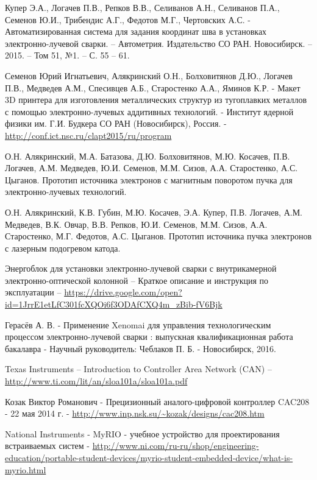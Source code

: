 \documentclass[14pt,russian,a4paper]{extarticle}
\begin{document}
\begin{thebibliography}{99}

Купер Э.А., Логачев П.В., Репков В.В., Селиванов А.Н., Селиванов П.А., Семенов Ю.И., Трибендис А.Г., Федотов М.Г., Чертовских А.С. -
Автоматизированная система для задания координат шва в установках электронно-лучевой сварки. –
Автометрия. Издательство СО РАН. Новосибирск. – 2015. – Том 51, №1. – С. 55 – 61.

Семенов Юрий Игнатьевич, Алякринский О.Н., Болховитянов Д.Ю., Логачев П.В., Медведев А.М., Спесивцев А.Б., Старостенко А.А., Яминов К.Р. -
Макет 3D принтера для изготовления металлических структур из тугоплавких металлов с помощью электронно-лучевых аддитивных технологий. -
Институт ядерной физики им. Г.И. Будкера СО РАН (Новосибирск), Россия. -
\url{http://conf.ict.nsc.ru/clapt2015/ru/program}

О.Н. Алякринский, М.А. Батазова, Д.Ю. Болховитянов, М.Ю. Косачев, П.В. Логачев, А.М. Медведев, Ю.И. Семенов, М.М. Сизов, А.А. Старостенко, А.С. Цыганов. Прототип источника электронов с магнитным поворотом пучка для электронно-лучевых технологий.

О.Н. Алякринский, К.В. Губин, М.Ю. Косачев, Э.А. Купер, П.В. Логачев, А.М. Медведев, В.К. Овчар, В.В. Репков, Ю.И. Семенов, М.М. Сизов, А.А. Старостенко, М.Г. Федотов, А.С. Цыганов. Прототип источника пучка электронов с лазерным подогревом катода.

Энергоблок для установки электронно-лучевой сварки с внутрикамерной электронно-оптической колонной – Краткое описание и инструкция по эксплуатации – \url{https://drive.google.com/open?id=1JrrE1etLfC301fcXQOi6f3ODAfCXQ4m_zBib-fV6Bjk}

Герасёв А. В. -
Применение Xenomai для управления технологическим процессом электронно-лучевой сварки : выпускная квалификационная работа бакалавра -
Научный руководитель: Чеблаков П. Б. -
Новосибирск, 2016.

Texas Instruments –
Introduction to Controller Area Network (CAN) –
\url{http://www.ti.com/lit/an/sloa101a/sloa101a.pdf}

Козак Виктор Романович -
Прецизионный аналого-цифровой контроллер CAC208 -
22 мая 2014 г. -
\url{http://www.inp.nsk.su/~kozak/designs/cac208.htm}

National Instruments -
MyRIO - учебное устройство для проектирования встраиваемых систем -
\url{http://www.ni.com/ru-ru/shop/engineering-education/portable-student-devices/myrio-student-embedded-device/what-is-myrio.html}


\end{thebibliography}
\end{document}
